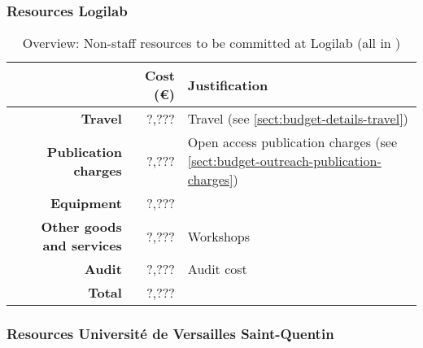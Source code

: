 \subsubsection{Resources Logilab}


\bigskip
\begin{table}[H]
\begin{tabular}{|r|r|p{9cm}|}
\hline
\textbf{} & \textbf{Cost (\euro)} & \textbf{Justification} \\\hline
\textbf{Travel} & ?,??? & Travel (see \ref{sect:budget-details-travel})\\\hline
\textbf{Publication charges} & ?,??? & Open access publication charges (see \ref{sect:budget-outreach-publication-charges})\\\hline
\textbf{Equipment} & ?,??? &  \\\hline    %

\textbf{Other goods and services} & ?,??? & Workshops \\\hline   %
\textbf{Audit} & ?,??? & Audit cost \\\hline
\textbf{Total} & ?,???\\\cline{1-2}
\end{tabular}
\caption{Overview: Non-staff resources to be committed at Logilab (all in \texteuro)}\vspace*{-1em}
\end{table}




\subsubsection{Resources Universit\'{e} de Versailles Saint-Quentin}


